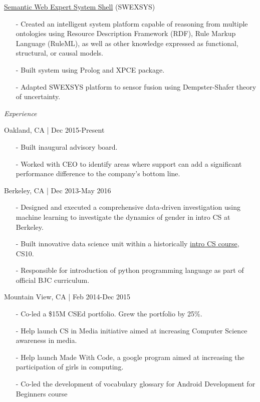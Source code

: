 \documentclass[11pt,article,oneside]{memoir}
\begin{document}
\ind \href{https://github.com/omoju/SWEXSYS}{Semantic Web Expert System Shell} (SWEXSYS)
\begin{itemize}[noitemsep,nolistsep]
\item[-] Created an intelligent system platform capable of reasoning from multiple ontologies using Resource Description Framework (RDF), Rule Markup Language (RuleML), as well as other knowledge expressed as functional, structural, or causal models.
\item[-] Built system using Prolog and XPCE package.
\item[-] Adapted SWEXSYS platform to sensor fusion using Dempster-Shafer theory of uncertainty.
\end{itemize} 

\bigskip 
  
\medskip

\noindent\emph{Experience \vspace{0.05in}}


 \hfill Oakland, CA | Dec 2015-Present
\begin{itemize}[noitemsep,nolistsep]
\item[-]Built inaugural advisory board.
\item[-]Worked with CEO to identify areas where support can add a significant performance difference to the company's bottom line.
\end{itemize} 

 \hfill Berkeley, CA | Dec 2013-May 2016
\begin{itemize}[noitemsep,nolistsep]
\item[-] Designed and executed a comprehensive data-driven investigation using machine learning to investigate the dynamics of gender in intro CS at Berkeley.
\item[-] Built innovative data science unit within a historically \href{http://www.whitehouse.gov/the-press-office/2014/12/08/fact-sheet-new-commitments-support-computer-science-education}{intro CS course}, CS10.
\item[-]Responsible for introduction of python programming language as part of official BJC curriculum.
\end{itemize} 

 \hfill Mountain View, CA | Feb 2014-Dec 2015 
\begin{itemize}[noitemsep,nolistsep]
\item[-]Co-led a \$15M CSEd portfolio. Grew the portfolio by 25\%.
\item[-]Help launch CS in Media initiative aimed at increasing Computer Science awareness in media.
\item[-]Help launch Made With Code, a google program aimed at increasing the participation of girls in computing.
\item[-]Co-led the development of vocabulary glossary for Android Development for Beginners course
\end{itemize} 
\end{document}
